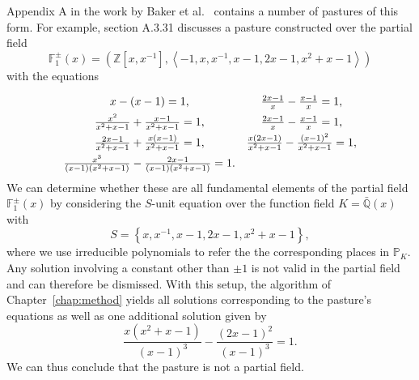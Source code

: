 Appendix A in the work by Baker et al.~\cite{baker-2023-foundations-of-matroids} contains a number of pastures of this form. For example, section A.3.31 discusses a pasture constructed over the partial field
\[\mathbb{F}_{1}^{\pm}(x) = \left( \mathbb{Z} \left[ x, x^{-1} \right], \left\langle -1, x, x^{-1}, x -1, 2x - 1, x^{2} + x - 1 \right\rangle \right)\]
with the equations
\begin{equation*}
  \def\arraystretch{1.5}
  \begin{array}{cc}
    x - (x - 1) = 1,                                                                  & \frac{2x - 1}{x} - \frac{x - 1}{x} = 1,                                    \\
    \frac{x^{2}}{x^{2} + x - 1} + \frac{x - 1}{x^{2} + x - 1} = 1,                    & \frac{2x - 1}{x} - \frac{x - 1}{x} = 1,                                    \\
    \frac{2x - 1}{x^{2} + x - 1} + \frac{x(x - 1)}{x^{2} + x - 1} = 1,                & \frac{x(2x - 1)}{x^{2} + x - 1} - \frac{{(x - 1)}^{2}}{x^{2} + x - 1} = 1, \\
    \frac{x^{3}}{(x - 1)(x^{2} + x - 1)} - \frac{2x - 1}{(x - 1)(x^{2} + x - 1)} = 1. &
  \end{array}
\end{equation*}
We can determine whether these are all fundamental elements of the partial field \(\mathbb{F}_{1}^{\pm}(x)\) by considering the \(S\)-unit equation over the function field \(K = \bar{\mathbb{Q}}(x)\) with
\[S = \left\{ x, x^{-1}, x -1, 2x - 1, x^{2} + x - 1 \right\},\]
where we use irreducible polynomials to refer the the corresponding places in \(\mathbb{P}_{K}\). Any solution involving a constant other than \(\pm 1\) is not valid in the partial field and can therefore be dismissed. With this setup, the algorithm of Chapter~\ref{chap:method} yields all solutions corresponding to the pasture's equations as well as one additional solution given by
\[\frac{x(x^{2} + x - 1)}{{(x - 1)}^{3}} - \frac{{(2x - 1)}^{2}}{{(x - 1)}^{3}} = 1.\]
We can thus conclude that the pasture is not a partial field.
